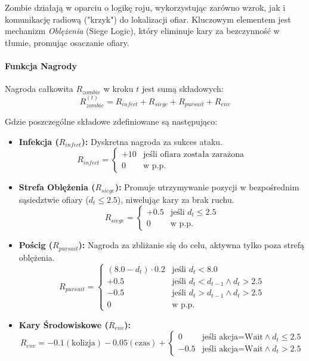 \documentclass[12pt,a4paper]{article}
\begin{document}
Zombie działają w oparciu o logikę roju, wykorzystując zarówno wzrok, jak i
komunikację radiową ("krzyk") do lokalizacji ofiar. Kluczowym elementem jest
mechanizm \textit{Oblężenia} (Siege Logic), który eliminuje kary za bezczynność
w tłumie, promując osaczanie ofiary.

\paragraph{Funkcja Nagrody}
Nagroda całkowita $R_{zombie}$ w kroku $t$ jest sumą składowych:
\begin{equation}
	R_{zombie}^{(t)} = R_{infect} + R_{siege} + R_{pursuit} + R_{env}
\end{equation}

Gdzie poszczególne składowe zdefiniowane są następująco:
\begin{itemize}
	\item \textbf{Infekcja ($R_{infect}$):} Dyskretna nagroda za sukces ataku.
	      $$ R_{infect} = \begin{cases} +10 & \text{jeśli ofiara została zarażona} \\ 0 & \text{w p.p.} \end{cases} $$

	\item \textbf{Strefa Oblężenia ($R_{siege}$):} Promuje utrzymywanie pozycji w bezpośrednim sąsiedztwie ofiary ($d_t \le 2.5$), niwelując kary za brak ruchu.
	      $$ R_{siege} = \begin{cases} +0.5 & \text{jeśli } d_t \le 2.5 \\ 0 & \text{w p.p.} \end{cases} $$

	\item \textbf{Pościg ($R_{pursuit}$):} Nagroda za zbliżanie się do celu, aktywna tylko poza strefą oblężenia.
	      $$ R_{pursuit} = \begin{cases}
			      (8.0 - d_t) \cdot 0.2 & \text{jeśli } d_t < 8.0                     \\
			      +0.5                  & \text{jeśli } d_t < d_{t-1} \land d_t > 2.5 \\
			      -0.5                  & \text{jeśli } d_t > d_{t-1} \land d_t > 2.5 \\
			      0                     & \text{w p.p.}
		      \end{cases} $$

	\item \textbf{Kary Środowiskowe ($R_{env}$):}
	      $$ R_{env} = -0.1 (\text{kolizja}) - 0.05 (\text{czas}) + \begin{cases} 0 & \text{jeśli akcja=Wait} \land d_t \le 2.5 \\ -0.5 & \text{jeśli akcja=Wait} \land d_t > 2.5 \end{cases} $$
\end{itemize}
\end{document}

